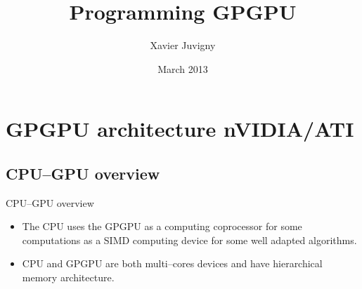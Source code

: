 \documentclass{beamer}
\title{Programming GPGPU}
\author[Juvigny]{Xavier Juvigny}
\institute{ONERA/CHP}
\date[C2013]{March 2013}
\begin{document}
\frame[plain]{\maketitle}

\section{GPGPU architecture nVIDIA/ATI}

\subsection{CPU--GPU overview}

\begin{frame}{CPU--GPU overview}

\begin{itemize}
\item The CPU uses the GPGPU as a computing coprocessor for some computations
  as a SIMD computing device for some well adapted algorithms.
\item CPU and GPGPU are both multi--cores devices and have hierarchical memory
architecture.
\end{itemize}


\end{frame}
\end{document}
